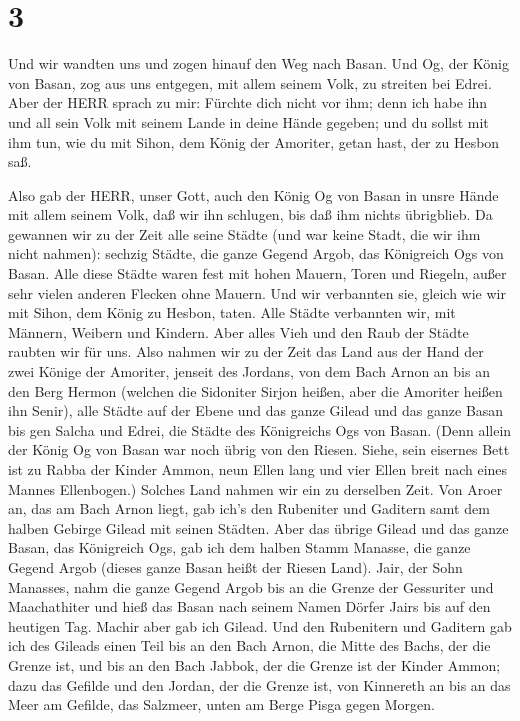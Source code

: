 \hypertarget{section-2}{%
\section{3}\label{section-2}}

 Und wir wandten uns und zogen hinauf den Weg nach Basan.
Und Og, der König von Basan, zog aus uns entgegen, mit allem seinem
Volk, zu streiten bei Edrei.  Aber der HERR sprach zu mir:
Fürchte dich nicht vor ihm; denn ich habe ihn und all sein Volk mit
seinem Lande in deine Hände gegeben; und du sollst mit ihm tun, wie du
mit Sihon, dem König der Amoriter, getan hast, der zu Hesbon saß.

 Also gab der HERR, unser Gott, auch den König Og von Basan
in unsre Hände mit allem seinem Volk, daß wir ihn schlugen, bis daß ihm
nichts übrigblieb.  Da gewannen wir zu der Zeit alle seine
Städte (und war keine Stadt, die wir ihm nicht nahmen): sechzig Städte,
die ganze Gegend Argob, das Königreich Ogs von Basan.  Alle
diese Städte waren fest mit hohen Mauern, Toren und Riegeln, außer sehr
vielen anderen Flecken ohne Mauern.  Und wir verbannten sie,
gleich wie wir mit Sihon, dem König zu Hesbon, taten. Alle Städte
verbannten wir, mit Männern, Weibern und Kindern.  Aber
alles Vieh und den Raub der Städte raubten wir für uns. 
Also nahmen wir zu der Zeit das Land aus der Hand der zwei Könige der
Amoriter, jenseit des Jordans, von dem Bach Arnon an bis an den Berg
Hermon  (welchen die Sidoniter Sirjon heißen, aber die
Amoriter heißen ihn Senir),  alle Städte auf der Ebene und
das ganze Gilead und das ganze Basan bis gen Salcha und Edrei, die
Städte des Königreichs Ogs von Basan.  (Denn allein der
König Og von Basan war noch übrig von den Riesen. Siehe, sein eisernes
Bett ist zu Rabba der Kinder Ammon, neun Ellen lang und vier Ellen breit
nach eines Mannes Ellenbogen.)  Solches Land nahmen wir ein
zu derselben Zeit. Von Aroer an, das am Bach Arnon liegt, gab ich's den
Rubeniter und Gaditern samt dem halben Gebirge Gilead mit seinen
Städten.  Aber das übrige Gilead und das ganze Basan, das
Königreich Ogs, gab ich dem halben Stamm Manasse, die ganze Gegend Argob
(dieses ganze Basan heißt der Riesen Land).  Jair, der Sohn
Manasses, nahm die ganze Gegend Argob bis an die Grenze der Gessuriter
und Maachathiter und hieß das Basan nach seinem Namen Dörfer Jairs bis
auf den heutigen Tag.  Machir aber gab ich Gilead.
 Und den Rubenitern und Gaditern gab ich des Gileads einen
Teil bis an den Bach Arnon, die Mitte des Bachs, der die Grenze ist, und
bis an den Bach Jabbok, der die Grenze ist der Kinder Ammon;
 dazu das Gefilde und den Jordan, der die Grenze ist, von
Kinnereth an bis an das Meer am Gefilde, das Salzmeer, unten am Berge
Pisga gegen Morgen.

